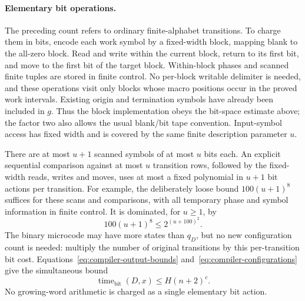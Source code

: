 \paragraph{Elementary bit operations.}
The preceding count refers to ordinary finite-alphabet transitions.
To charge them in bits, encode each work symbol by a fixed-width block,
mapping blank to the all-zero block.  Read and write within the current
block, return to its first bit, and move to the first bit of the target
block.  Within-block phases and scanned finite tuples are stored in
finite control.  No per-block writable delimiter is needed, and these
operations visit only blocks whose macro positions occur in the proved
work intervals.  Existing origin and termination symbols have already
been included in $g$.  Thus the block implementation obeys the bit-space
estimate above; the factor two also allows the usual blank/bit tape
convention.  Input-symbol access has fixed width and is covered by the
same finite description parameter $u$.

There are at most $u+1$ scanned symbols of at most $u$ bits each.
An explicit sequential comparison against at most $u$ transition rows,
followed by the fixed-width reads, writes and moves, uses at most a
fixed polynomial in $u+1$ bit actions per transition.  For example,
the deliberately loose bound $100(u+1)^8$ suffices for these scans
and comparisons, with all temporary phase and symbol information in
finite control.  It is dominated, for $u\ge1$, by
\[
 100(u+1)^8\le2^{(u+100)^2}.
\]
The binary microcode may have more states than $q_D$, but no new
configuration count is needed: multiply the number of original
transitions by this per-transition bit cost.  Equations~\eqref{eq:compiler-output-bounds}
and~\eqref{eq:compiler-configurations} give the simultaneous bound
\begin{equation}\label{eq:compiler-time-bound}
 \operatorname{time}_{\mathrm{bit}}(D,x)
 \le H(n+2)^c.
\end{equation}
No growing-word arithmetic is charged as a single elementary bit action.

